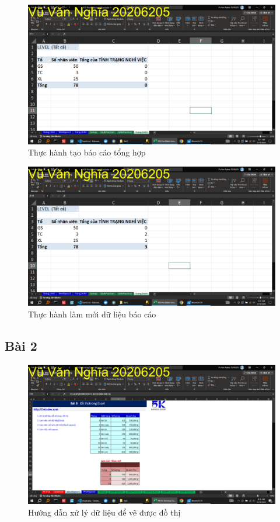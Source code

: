 \documentclass{article}
\begin{document}
\begin{figure}[H]
\centering
\includegraphics[scale = 0.15]{Bai1/ThucHanh/1.png}
\caption{Thực hành tạo báo cáo tổng hợp}
\end{figure}

\begin{figure}[H]
\centering
\includegraphics[scale = 0.15]{Bai1/ThucHanh/2.png}
\caption{Thực hành làm mới dữ liệu báo cáo}
\end{figure}

\subsection{Bài 2}

\begin{figure}[H]
\centering
\includegraphics[scale = 0.15]{Bai2/HuongDan/0.png}
\caption{Hướng dẫn xử lý dữ liệu để vẽ được đồ thị}
\end{figure}
\end{document}
